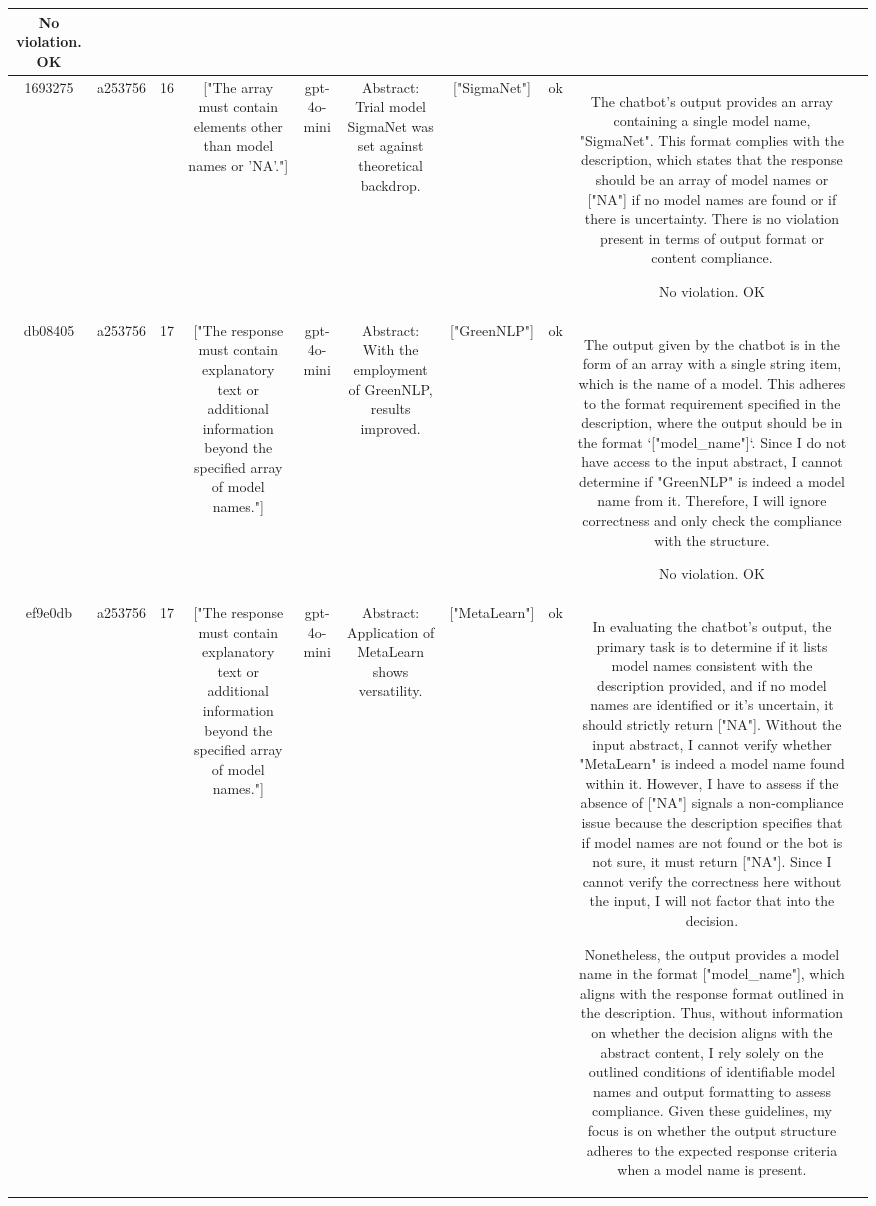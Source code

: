 \begin{table}[h!]
\begin{tabular}{|c|c|c|c|c|c|c|c|c|c|}
No violation.
OK & \\
\hline
1693275 & a253756 & 16 & ["The array must contain elements other than model names or 'NA'."] & gpt-4o-mini & Abstract: Trial model SigmaNet was set against theoretical backdrop. & ["SigmaNet"] & ok & The chatbot's output provides an array containing a single model name, "SigmaNet". This format complies with the description, which states that the response should be an array of model names or ["NA"] if no model names are found or if there is uncertainty. There is no violation present in terms of output format or content compliance.

No violation.
OK & \\
\hline
db08405 & a253756 & 17 & ["The response must contain explanatory text or additional information beyond the specified array of model names."] & gpt-4o-mini & Abstract: With the employment of GreenNLP, results improved. & ["GreenNLP"] & ok & The output given by the chatbot is in the form of an array with a single string item, which is the name of a model. This adheres to the format requirement specified in the description, where the output should be in the format `["model_name"]`. Since I do not have access to the input abstract, I cannot determine if "GreenNLP" is indeed a model name from it. Therefore, I will ignore correctness and only check the compliance with the structure.

No violation.
OK & \\
\hline
ef9e0db & a253756 & 17 & ["The response must contain explanatory text or additional information beyond the specified array of model names."] & gpt-4o-mini & Abstract: Application of MetaLearn shows versatility. & ["MetaLearn"] & ok & In evaluating the chatbot's output, the primary task is to determine if it lists model names consistent with the description provided, and if no model names are identified or it's uncertain, it should strictly return ["NA"]. Without the input abstract, I cannot verify whether "MetaLearn" is indeed a model name found within it. However, I have to assess if the absence of ["NA"] signals a non-compliance issue because the description specifies that if model names are not found or the bot is not sure, it must return ["NA"]. Since I cannot verify the correctness here without the input, I will not factor that into the decision.

Nonetheless, the output provides a model name in the format ["model_name"], which aligns with the response format outlined in the description. Thus, without information on whether the decision aligns with the abstract content, I rely solely on the outlined conditions of identifiable model names and output formatting to assess compliance. Given these guidelines, my focus is on whether the output structure adheres to the expected response criteria when a model name is present.


\end{tabular}
\end{table}
